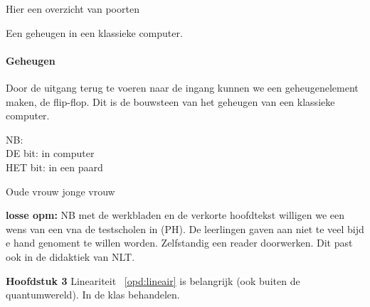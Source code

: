\documentclass[../../main.tex]{subfiles}
\begin{document}
Hier een overzicht van poorten


Een geheugen in een klassieke computer.
\paragraph{Geheugen}


Door de uitgang terug te voeren naar de ingang kunnen we een geheugenelement maken, de flip-flop. Dit is de bouwsteen van het geheugen van een klassieke computer. 







NB:\\
DE bit: in computer\\
HET bit: in een paard



Oude vrouw jonge vrouw

\textbf{losse opm:} NB met de werkbladen en de verkorte hoofdtekst willigen we een wens van een vna de testscholen in (PH). De leerlingen gaven aan niet te veel bijd e hand genoment te willen worden. Zelfstandig een reader doorwerken. Dit past ook in de didaktiek van NLT. 
 

\textbf{Hoofdstuk 3}
Lineariteit ~\ref{opd:lineair} is belangrijk (ook buiten de quantumwereld). In de klas behandelen.
\end{document}
